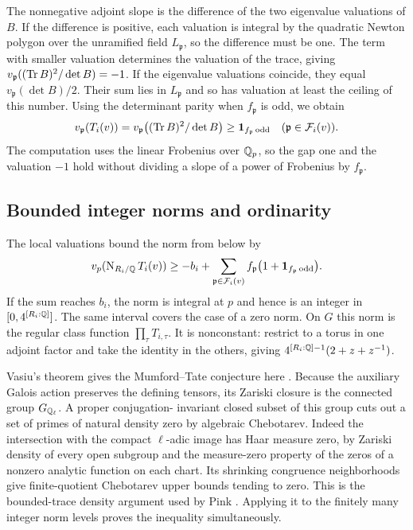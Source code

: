 The nonnegative adjoint slope is the difference of the two eigenvalue
valuations of \(B\). If the difference is positive, each valuation
is integral by the quadratic Newton polygon over the unramified
field \(L_{\mathfrak p}\), so the difference must be one. The term
with smaller valuation determines the valuation of the trace, giving
\(v_{\mathfrak p}((\operatorname{Tr} B)^2/\det B)=-1\). If the eigenvalue valuations
coincide, they equal \(v_{\mathfrak p}(\det B)/2\). Their sum lies in
\(L_{\mathfrak p}\) and so has valuation at least the ceiling of this
number. Using the determinant parity when \(f_{\mathfrak p}\) is odd,
we obtain
\[
 v_{\mathfrak p}(T_i(v))
   =v_{\mathfrak p}\bigl((\operatorname{Tr} B)^2/\det B\bigr)
   \ge\mathbf 1_{f_{\mathfrak p}\,\mathrm{odd}}
   \quad(\mathfrak p\in\mathcal F_i(v)).
\]
The computation uses the linear Frobenius over \(\mathbb Q_p\), so the gap
one and the valuation \(-1\) hold without dividing a slope of a power
of Frobenius by \(f_{\mathfrak p}\).

\subsection{Bounded integer norms and ordinarity}

The local valuations bound the norm from below by
\[
 v_p(\operatorname{N}_{R_i/\mathbb Q}T_i(v))\ge -b_i+
 \sum_{\mathfrak p\in\mathcal F_i(v)}
 f_{\mathfrak p}\bigl(1+\mathbf 1_{f_{\mathfrak p}\,\mathrm{odd}}\bigr).
\]
If the sum reaches \(b_i\), the norm is integral at \(p\) and hence is
an integer in \([0,4^{[R_i:\mathbb Q]}]\). The same interval covers the case
of a zero norm. On \(G\) this norm is the regular class function
\(\prod_\tau T_{i,\tau}\). It is nonconstant: restrict to a torus in
one adjoint factor and take the identity in the others, giving
\(4^{[R_i:\mathbb Q]-1}(2+z+z^{-1})\).

Vasiu's theorem gives the Mumford--Tate conjecture here
\cite[Theorem~1.3.4(a) and Example~1.3.5(iv)]{vasiu}. Because the
auxiliary Galois action preserves the defining tensors, its Zariski
closure is the connected group \(G_{\mathbb Q_\ell}\). A proper conjugation-
invariant closed subset of this group cuts out a set of primes of
natural density zero by algebraic Chebotarev. Indeed the intersection
with the compact \(\ell\)-adic image has Haar measure zero, by Zariski
density of every open subgroup and the measure-zero property of the
zeros of a nonzero analytic function on each chart. Its shrinking
congruence neighborhoods give finite-quotient Chebotarev upper
bounds tending to zero. This is the bounded-trace density argument
used by Pink \cite[Lemmas~7.21--7.22]{pink}. Applying it to the
finitely many integer norm levels proves the inequality simultaneously.


